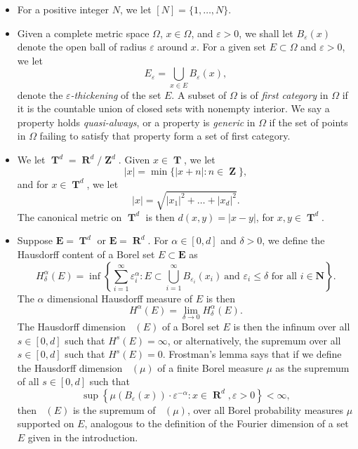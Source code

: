 \documentclass[12pt,reqno]{article}
\DeclareMathOperator{\hausdim}{\dim_{\mathbf{H}}}
\DeclareMathOperator{\RR}{\mathbf{R}}
\DeclareMathOperator{\ZZ}{\mathbf{Z}}
\DeclareMathOperator{\TT}{\mathbf{T}}
\begin{document}
\begin{itemize}
    \item For a positive integer $N$, we let $[N] = \{ 1, \dots, N \}$.

    \item Given a complete metric space $\Omega$, $x \in \Omega$, and $\varepsilon > 0$, we shall let $B_\varepsilon(x)$ denote the open ball of radius $\varepsilon$ around $x$. For a given set $E \subset \Omega$ and $\varepsilon > 0$, we let
    \[ E_\varepsilon = \bigcup_{x \in E} B_\varepsilon(x), \]
    denote the \emph{$\varepsilon$-thickening} of the set $E$. A subset of $\Omega$ is of \emph{first category} in $\Omega$ if it is the countable union of closed sets with nonempty interior. We say a property holds \emph{quasi-always}, or a property is \emph{generic} in $\Omega$ if the set of points in $\Omega$ failing to satisfy that property form a set of first category.

    \item We let $\TT^d = \RR^d/\ZZ^d$. Given $x \in \TT$, we let
    \[ |x| = \min \{ |x + n| : n \in \ZZ \}, \]
    and for $x \in \TT^d$, we let
    \[ |x| = \sqrt{|x_1|^2 + \dots + |x_d|^2}. \]
    The canonical metric on $\TT^d$ is then $d(x,y) = |x - y|$, for $x,y \in \TT^d$.

    \item Suppose $\mathbf{E} = \TT^d$ or $\mathbf{E} = \RR^d$. For $\alpha \in [0,d]$ and $\delta > 0$, we define the Hausdorff content of a Borel set $E \subset \mathbf{E}$ as
    \[ H^\alpha_\delta(E) = \inf \left\{ \sum_{i = 1}^\infty \varepsilon_i^\alpha : E \subset \bigcup_{i = 1}^\infty B_{\varepsilon_i}(x_i)\ \text{and $\varepsilon_i \leq \delta$ for all $i \in \mathbf{N}$} \right\}. \]
    The $\alpha$ dimensional Hausdorff measure of $E$ is then
    \[ H^\alpha(E) = \lim_{\delta \to 0} H^\alpha_\delta(E). \]
    The Hausdorff dimension $\hausdim(E)$ of a Borel set $E$ is then the infinum over all $s \in [0,d]$ such that $H^s(E) = \infty$, or alternatively, the supremum over all $s \in [0,d]$ such that $H^s(E) = 0$. Frostman's lemma says that if we define the Hausdorff dimension $\hausdim(\mu)$ of a finite Borel measure $\mu$ as the supremum of all $s \in [0,d]$ such that
    \begin{equation} \label{hausdim}
        \sup \left\{ \mu(B_\varepsilon(x)) \cdot \varepsilon^{-\alpha} : x \in \RR^d, \varepsilon > 0 \right\} < \infty,
    \end{equation}
    then $\hausdim(E)$ is the supremum of $\hausdim(\mu)$, over all Borel probability measures $\mu$ supported on $E$, analogous to the definition of the Fourier dimension of a set $E$ given in the introduction.


\end{itemize}
\end{document}
